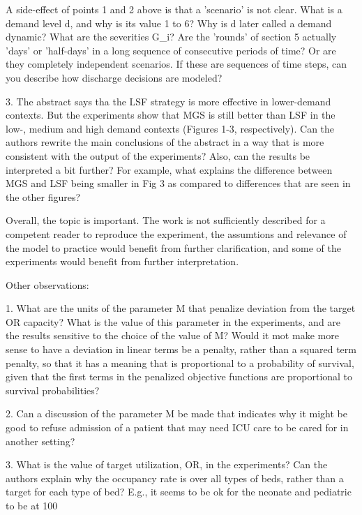 A side-effect of points 1 and 2 above is that a 'scenario' is not clear. What is a demand level d, and why is its value 1 to 6? Why is d later called a demand dynamic? What are the severities G_i? Are the 'rounds' of section 5 actually 'days' or 'half-days' in a long sequence of consecutive periods of time? Or are they completely independent scenarios. If these are sequences of time steps, can you describe how discharge decisions are modeled?

3. The abstract says tha the LSF strategy is more effective in lower-demand contexts. But the experiments show that MGS is still better than LSF in the low-, medium and high demand contexts (Figures 1-3, respectively). Can the authors rewrite the main conclusions of the abstract in a way that is more consistent with the output of the experiments? Also, can the results be interpreted a bit further? For example, what explains the difference between MGS and LSF being smaller in Fig 3 as compared to differences that are seen in the other figures?

Overall, the topic is important. The work is not sufficiently described for a competent reader to reproduce the experiment, the assumtions and relevance of the model to practice would benefit from further clarification, and some of the experiments would benefit from further interpretation.

Other observations:

1. What are the units of the parameter M that penalize deviation from the target OR capacity? What is the value of this parameter in the experiments, and are the results sensitive to the choice of the value of M? Would it mot make more sense to have a deviation in linear terms be a penalty, rather than a squared term penalty, so that it has a meaning that is proportional to a probability of survival, given that the first terms in the penalized objective functions are proportional to survival probabilities?

2. Can a discussion of the parameter M be made that indicates why it might be good to refuse admission of a patient that may need ICU care to be cared for in another setting?

3. What is the value of target utilization, OR, in the experiments? Can the authors explain why the occupancy rate is over all types of beds, rather than a target for each type of bed? E.g., it seems to be ok for the neonate and pediatric to be at 100%

